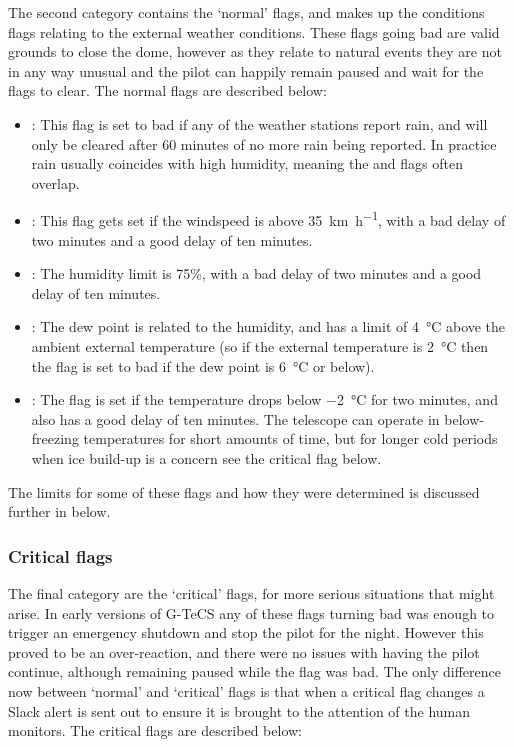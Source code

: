 \begin{colsection}
The second category contains the `normal' flags, and makes up the conditions flags relating to the external weather conditions. These flags going bad are valid grounds to close the dome, however as they relate to natural events they are not in any way unusual and the pilot can happily remain paused and wait for the flags to clear. The normal flags are described below:

\begin{itemize}
    \item {}: This flag is set to bad if any of the weather stations report rain, and will only be cleared after 60 minutes of no more rain being reported. In practice rain usually coincides with high humidity, meaning the  and  flags often overlap.

    \item {}: This flag gets set if the windspeed is above \SI[per-mode=symbol]{35}{\kilo\meter\per\hour}, with a bad delay of two minutes and a good delay of ten minutes.

    \item {}: The humidity limit is 75\%, with a bad delay of two minutes and a good delay of ten minutes.

    \item {}: The dew point is related to the humidity, and has a limit of \SI{4}{\celsius} above the ambient external temperature (so if the external temperature is \SI{2}{\celsius} then the flag is set to bad if the dew point is \SI{6}{\celsius} or below).

    \item {}: The  flag is set if the temperature drops below \SI{-2}{\celsius} for two minutes, and also has a good delay of ten minutes. The telescope can operate in below-freezing temperatures for short amounts of time, but for longer cold periods when ice build-up is a concern see the critical  flag below.
\end{itemize}

The limits for some of these flags and how they were determined is discussed further in  below.

\subsubsection{Critical flags}

The final category are the `critical' flags, for more serious situations that might arise. In early versions of G-TeCS any of these flags turning bad was enough to trigger an emergency shutdown and stop the pilot for the night. However this proved to be an over-reaction, and there were no issues with having the pilot continue, although remaining paused while the flag was bad. The only difference now between `normal' and `critical' flags is that when a critical flag changes a Slack alert is sent out to ensure it is brought to the attention of the human monitors. The critical flags are described below:


\end{colsection}
